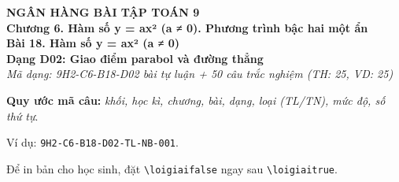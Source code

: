 \documentclass[12pt,a4paper]{article}
\newif\ifloigiai
\begin{document}
\begin{center}
{\Large\textbf{NGÂN HÀNG BÀI TẬP TOÁN 9}}\\[3pt]
\textbf{Chương 6. Hàm số y = ax² (a ≠ 0). Phương trình bậc hai một ẩn}\\[2pt]
\textbf{Bài 18. Hàm số y = ax² (a ≠ 0)}\\[2pt]
\textbf{Dạng D02: Giao điểm parabol và đường thẳng}\\[2pt]
\textit{Mã dạng: 9H2-C6-B18-D02  bài tự luận + 50 câu trắc nghiệm \quad (TH: 25, VD: 25)}
\end{center}
\textbf{Quy ước mã câu:} \textit{khối, học kì, chương, bài, dạng, loại (TL/TN), mức độ, số thứ tự}.\par Ví dụ: \texttt{9H2-C6-B18-D02-TL-NB-001}.\par Để in bản cho học sinh, đặt \verb|\loigiaifalse| ngay sau \verb|\loigiaitrue|.
\end{document}
